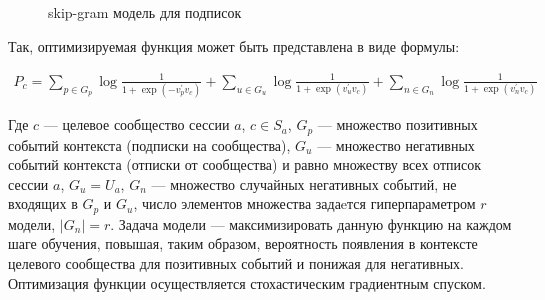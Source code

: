 \documentclass[times,specification,annotation]{itmo-student-thesis}
\begin{document}
\begin{figure}[!h]
\caption{skip-gram модель для подписок}\label{fig2}
\centering
{}
\end{figure}

Так, оптимизируемая функция может быть представлена в виде формулы:

\begin{align}
P_c = \sum_{p \in G_p} \log \frac{1}{1 + \exp(-v_p^{'}v_c)} + \sum_{u \in G_u} \log \frac{1}{1 + \exp(v_u^{'}v_c)} + \sum_{n \in G_n} \log \frac{1}{1 + \exp(v_n^{'}v_c)} \label{eq3}
\end{align}

Где $c$ --- целевое сообщество сессии $a$, $c \in S_a$, $G_p$ --- множество позитивных событий
контекста (подписки на сообщества), $G_u$ --- множество негативных событий
контекста (отписки от сообщества) и равно множеству всех отписок сессии $a$, $G_u = U_a$, $G_n$ --- множество случайных негативных событий, не входящих в $G_p$ и $G_u$, число элементов множества задаeтся гиперпараметром $r$ модели, $|G_n| = r$. Задача модели --- максимизировать данную
функцию на каждом шаге обучения, повышая, таким образом, вероятность появления в контексте целевого сообщества для позитивных событий и понижая для негативных. Оптимизация функции осуществляется стохастическим градиентным спуском. 
\end{document}
